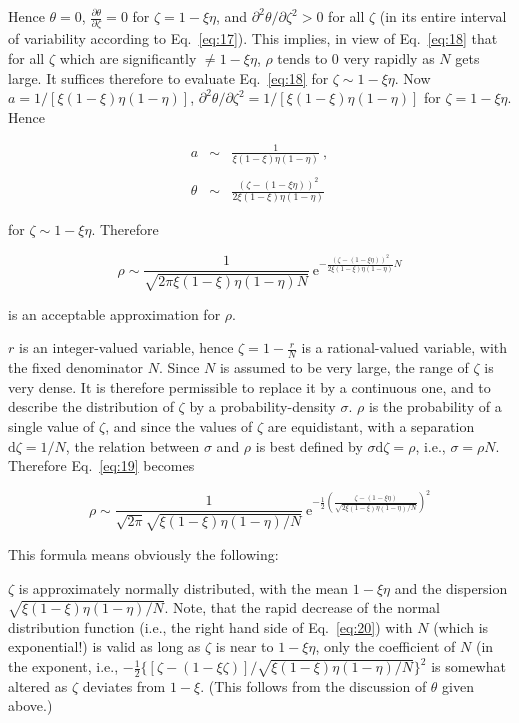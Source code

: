 \documentclass[twocolumn,preprintnumbers,amsmath,amssymb,floatfix]{revtex4}
\begin{document}
Hence $\theta=0$, $\frac{\partial\theta}{\partial\zeta}=0$ for
$\zeta=1-\xi\eta$, and $\partial^2\theta/\partial\zeta^2>0$ for
all $\zeta$ (in its entire interval of variability according to
Eq.~\ref{eq:17}). This implies, in view of Eq.~\ref{eq:18} that
for all $\zeta$ which are significantly $\neq 1-\xi\eta$, $\rho$
tends to 0 very rapidly as $N$ gets large. It suffices therefore
to evaluate Eq.~\ref{eq:18} for $\zeta\sim1-\xi\eta$. Now
$a=1/[\xi(1-\xi)\eta(1-\eta)]$,
$\partial^2\theta/\partial\zeta^2=1/[\xi(1-\xi)\eta(1-\eta)]$ for
$\zeta=1-\xi\eta$. Hence

\begin{eqnarray*}
a & \sim & \frac{1}{\xi(1-\xi)\eta(1-\eta)}~,\\\\
\theta & \sim &
\frac{(\zeta-(1-\xi\eta))^2}{2\xi(1-\xi)\eta(1-\eta)}
\end{eqnarray*}

\noindent for $\zeta\sim1-\xi\eta$. Therefore

\begin{equation}
\label{eq:19} \rho \sim
\frac{1}{\sqrt{2\pi\xi(1-\xi)\eta(1-\eta)N}}~\mathrm{e}^{-\frac{(\zeta-(1-\xi\eta))^2}{2\xi(1-\xi)\eta(1-\eta)}N}
\end{equation}

\noindent is an acceptable approximation for $\rho$.

$r$ is an integer-valued variable, hence $\zeta=1-\frac{r}{N}$ is
a rational-valued variable, with the fixed denominator $N$. Since
$N$ is assumed to be very large, the range of $\zeta$ is very
dense. It is therefore permissible to replace it by a continuous
one, and to describe the distribution of $\zeta$ by a
probability-density $\sigma$. $\rho$ is the probability of a
single value of $\zeta$, and since the values of $\zeta$ are
equidistant, with a separation $\mathrm{d}\zeta=1/N$, the relation
between $\sigma$ and $\rho$ is best defined by
$\sigma\mathrm{d}\zeta=\rho$, i.e., $\sigma=\rho N$. Therefore
Eq.~\ref{eq:19} becomes

\begin{equation}
\label{eq:20} \rho \sim
\frac{1}{\sqrt{2\pi}\sqrt{\xi(1-\xi)\eta(1-\eta)/N}}~\mathrm{e}^{-\frac{1}{2}{\left(\frac{\zeta-(1-\xi\eta)}{\sqrt{2\xi(1-\xi)\eta(1-\eta)/N}}\right)}^2}
\end{equation}

\noindent This formula means obviously the following:

$\zeta$ is approximately normally distributed, with the mean
$1-\xi\eta$ and the dispersion $\sqrt{\xi(1-\xi)\eta(1-\eta)/N}$.
Note, that the rapid decrease of the normal distribution function
(i.e., the right hand side of Eq.~\ref{eq:20}) with $N$ (which is
exponential!) is valid as long as $\zeta$ is near to $1-\xi\eta$,
only the coefficient of $N$ (in the exponent, i.e.,
$-\frac{1}{2}\{[\zeta-(1-\xi\zeta)]/\sqrt{\xi(1-\xi)\eta(1-\eta)/N}\}^2$
is somewhat altered as $\zeta$ deviates from $1-\xi$. (This
follows from the discussion of $\theta$ given above.)
\end{document}
